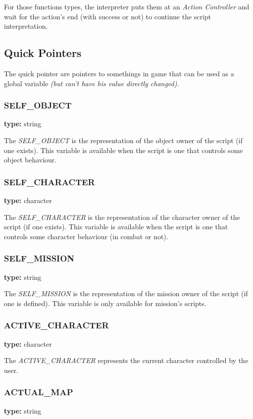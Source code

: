 \documentclass[ letterpaper,12pt]{article}
\begin{document}
   For those functions types, the interpreter puts them at an {\it Action 
Controller} and wait for the action's end (with success or not) to continue 
the script interpretation. 

\subsection{Quick Pointers}

The quick pointer are pointers to somethings in game that can be used as a
global variable {\it (but can't have his value directly changed)}.

\subsubsection{SELF\_OBJECT}
{\bf type:} string

The {\it SELF\_OBJECT} is the representation of the object owner of the script
(if one exists). This variable is available when the script is one that
controls some object behaviour.

\subsubsection{SELF\_CHARACTER}
{\bf type:} character

The {\it SELF\_CHARACTER} is the representation of the character owner of the
script (if one exists). This variable is available when the script is one that
controls some character behaviour (in combat or not).

\subsubsection{SELF\_MISSION}
{\bf type:} string

The {\it SELF\_MISSION} is the representation of the mission owner of the script
(if one is defined). This variable is only available for mission's scripts.

\subsubsection{ACTIVE\_CHARACTER}
{\bf type:} character

The {\it ACTIVE\_CHARACTER} represents the current character controlled by the
user.

\subsubsection{ACTUAL\_MAP}
{\bf type:} string
\end{document}
